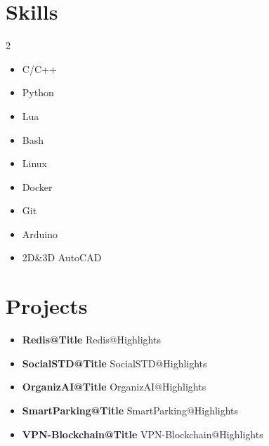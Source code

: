 \documentclass[letterpaper,11pt]{article}
\newcommand{\resumeSubHeadingListStart}{\begin{itemize}[leftmargin=0.0in, label={}]}
\newcommand{\resumeSubHeadingListEnd}{\end{itemize}}
\begin{document}
\section{Skills}
\begin{multicols}{2}
    \setlength{\columnsep}{0pt}
    \begin{itemize}[leftmargin=0.15in, label={}]
        \item{{C/C++}\dotfill}
        \item{{Python}\dotfill}
        \item{{Lua}\dotfill}
        \item{{Bash}\dotfill}
        \item{{Linux}\dotfill}
        \item{{Docker}\dotfill}
        \item{{Git}\dotfill}
        \item{{Arduino}\dotfill}
        \item{{2D\&3D AutoCAD}\dotfill}
    \end{itemize}
\end{multicols}


\newcommand{\renderGit}[1]{
    \item \textbf{\csname #1@Title\endcsname}
    \csname #1@Highlights\endcsname
}

\section{Projects}
\resumeSubHeadingListStart
    \renderGit{Redis}
    \renderGit{SocialSTD}
    \renderGit{OrganizAI}
    \renderGit{SmartParking}
    \renderGit{VPN-Blockchain}
\resumeSubHeadingListEnd
\end{document}
